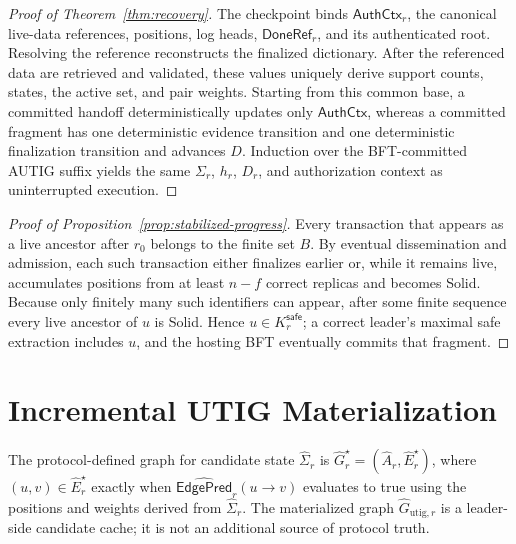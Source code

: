 \begin{proof}[Proof of Theorem~\ref{thm:recovery}]
The checkpoint binds $\mathsf{AuthCtx}_r$, the canonical live-data references,
positions, log heads, $\mathsf{DoneRef}_r$, and its authenticated root.  Resolving the
reference reconstructs the finalized dictionary.  After the referenced data
are retrieved and validated, these values uniquely derive support counts, states,
the active set, and pair weights.  Starting from this common base, a committed
handoff deterministically updates only $\mathsf{AuthCtx}$, whereas a committed
fragment has one deterministic evidence transition and one deterministic
finalization transition and advances $D$.  Induction over the BFT-committed
AUTIG suffix yields the same $\Sigma_r$, $h_r$, $D_r$, and authorization context
as uninterrupted execution.
\end{proof}

\begin{proof}[Proof of Proposition~\ref{prop:stabilized-progress}]
Every transaction that appears as a live ancestor after $r_0$ belongs to the finite set $B$.  By eventual dissemination and admission, each such transaction either finalizes earlier or, while it remains live, accumulates positions from at least $n-f$ correct replicas and becomes Solid.  Because only finitely many such identifiers can appear, after some finite sequence
every live ancestor of $u$ is Solid.  Hence $u\in K_r^{\mathsf{safe}}$; a correct leader's maximal safe extraction includes $u$, and the hosting BFT eventually commits that fragment.
\end{proof}

\section{Incremental UTIG Materialization}
\label{app:incremental-materialization}

The protocol-defined graph for candidate state $\widehat\Sigma_r$ is
$\widehat G_r^\star=(\widehat A_r,\widehat E_r^\star)$, where
$(u,v)\in\widehat E_r^\star$ exactly when
$\widehat{\mathsf{EdgePred}}_r(u\to v)$ evaluates to true using the positions and
weights derived from $\widehat\Sigma_r$.  The materialized graph
$\widehat G_{\mathrm{utig},r}$ is a leader-side candidate cache; it is not an
additional source of protocol truth.

